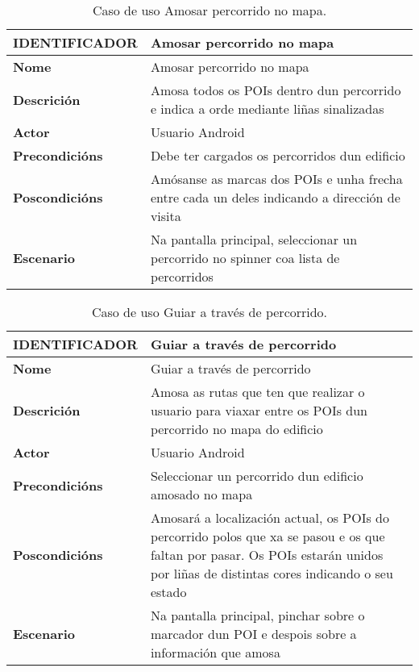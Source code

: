 \begin{table}[tbh]
	\begin{tabular}{|l|p{10cm}|}
		\hline 
		\textbf{IDENTIFICADOR}	& \textbf{Amosar percorrido no mapa} \\ 
		\hline 
		\textbf{Nome} & Amosar percorrido no mapa \\ 
		\hline 
		\textbf{Descrición} & Amosa todos os POIs dentro dun percorrido e indica a orde mediante liñas sinalizadas \\ 
		\hline 
		\textbf{Actor} & Usuario Android \\ 
		\hline 
		\textbf{Precondicións} & Debe ter cargados os percorridos dun edificio \\ 
		\hline 
		\textbf{Poscondicións} & Amósanse as marcas dos POIs e unha frecha entre cada un deles indicando a dirección de visita \\ 
		\hline 
		\textbf{Escenario} & Na pantalla principal, seleccionar un percorrido no spinner coa lista de percorridos \\ 
		\hline 
	\end{tabular}
	\caption{Caso de uso Amosar percorrido no mapa.}
	\label{tab:cuAmosarPercorridoMapa}
\end{table}

\begin{table}[tbh]
	\begin{tabular}{|l|p{10cm}|}
		\hline 
		\textbf{IDENTIFICADOR}	& \textbf{Guiar a través de percorrido} \\ 
		\hline 
		\textbf{Nome} & Guiar a través de percorrido \\ 
		\hline 
		\textbf{Descrición} & Amosa as rutas que ten que realizar o usuario para viaxar entre os POIs dun percorrido no mapa do edificio \\ 
		\hline 
		\textbf{Actor} & Usuario Android \\ 
		\hline 
		\textbf{Precondicións} & Seleccionar un percorrido dun edificio amosado no mapa \\ 
		\hline 
		\textbf{Poscondicións} & Amosará a localización actual, os POIs do percorrido polos que xa se pasou e os que faltan por pasar. Os POIs estarán unidos por liñas de distintas cores indicando o seu estado \\ 
		\hline 
		\textbf{Escenario} & Na pantalla principal, pinchar sobre o marcador dun POI e despois sobre a información que amosa \\ 
		\hline 
	\end{tabular}
	\caption{Caso de uso Guiar a través de percorrido.}
	\label{tab:cuGuiarPercorrido}
\end{table}

